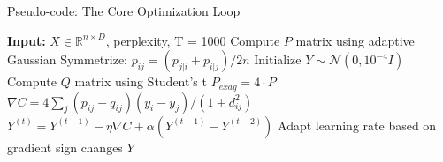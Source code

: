 \documentclass[aspectratio=169]{beamer}
\begin{document}
\begin{frame}{Pseudo-code: The Core Optimization Loop}
\begin{algorithm}[H]
\caption{t-SNE Core Loop}
\begin{algorithmic}[1]
\STATE \textbf{Input:} $X \in \mathbb{R}^{n \times D}$, perplexity, T = 1000
\STATE Compute $P$ matrix using adaptive Gaussian
\STATE Symmetrize: $p_{ij} = (p_{j|i} + p_{i|j})/2n$
\STATE Initialize $Y \sim \mathcal{N}(0, 10^{-4}I)$
\STATE Compute $Q$ matrix using Student's t
\STATE $P_{exag} = 4 \cdot P$ 
\ENDIF
\STATE $\nabla C = 4\sum_j (p_{ij} - q_{ij})(y_i - y_j)/(1 + d_{ij}^2)$
\STATE $Y^{(t)} = Y^{(t-1)} - \eta\nabla C + \alpha(Y^{(t-1)} - Y^{(t-2)})$
\STATE Adapt learning rate based on gradient sign changes
\ENDFOR
\RETURN $Y$
\end{algorithmic}
\end{algorithm}
\end{frame}
\end{document}
